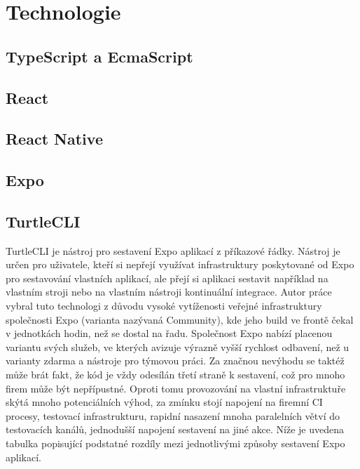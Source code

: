 
\chapter{Technologie}

\section{TypeScript a EcmaScript}

\section{React}

\section{React Native}

\section{Expo}

\section{TurtleCLI}

TurtleCLI je nástroj pro sestavení Expo aplikací z příkazové řádky. Nástroj je určen pro uživatele, kteří si nepřejí využívat infrastruktury poskytované od Expo pro sestavování vlastních aplikací, ale přejí si aplikaci sestavit například na vlastním stroji nebo na vlastním nástroji kontinuální integrace. Autor práce vybral tuto technologi z důvodu vysoké vytíženosti veřejné infrastruktury společnosti Expo (varianta nazývaná Community), kde jeho build ve frontě čekal v jednotkách hodin, než se dostal na řadu. Společnost Expo nabízí placenou variantu svých služeb, ve kterých avizuje výrazně vyšší rychlost odbavení, než u varianty zdarma a nástroje pro týmovou práci. Za značnou nevýhodu se taktéž může brát fakt, že kód je vždy odesílán třetí straně k sestavení, což pro mnoho firem může být nepřípustné. Oproti tomu provozování na vlastní infrastruktuře skýtá mnoho potenciálních výhod, za zmínku stojí napojení na firemní CI procesy, testovací infrastrukturu, rapidní nasazení mnoha paralelních větví do testovacích kanálů, jednodušší napojení sestavení na jiné akce. Níže je uvedena tabulka popisující podstatné rozdíly mezi jednotlivými způsoby sestavení Expo aplikací. 

